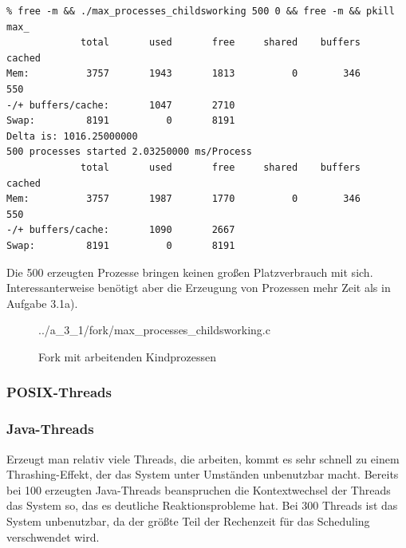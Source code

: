 \documentclass[a4paper,
12pt,
BCOR12mm,
]{scrartcl}
\begin{document}
\begin{verbatim}
% free -m && ./max_processes_childsworking 500 0 && free -m && pkill max_
             total       used       free     shared    buffers     cached
Mem:          3757       1943       1813          0        346        550
-/+ buffers/cache:       1047       2710
Swap:         8191          0       8191
Delta is: 1016.25000000
500 processes started 2.03250000 ms/Process
             total       used       free     shared    buffers     cached
Mem:          3757       1987       1770          0        346        550
-/+ buffers/cache:       1090       2667
Swap:         8191          0       8191
\end{verbatim}
Die 500 erzeugten Prozesse bringen keinen großen Platzverbrauch mit sich.
Interessanterweise benötigt aber die Erzeugung von Prozessen mehr Zeit als in Aufgabe
3.1a).
\begin{figure}[h!]
	\begin{center}
		 {../a_3_1/fork/max_processes_childsworking.c}
	\end{center}
	\caption{Fork mit arbeitenden Kindprozessen}
	\label{fig:fork_childsworking_listing}
\end{figure}

\subsubsection*{POSIX-Threads}

\subsubsection*{Java-Threads}
Erzeugt man relativ viele Threads, die arbeiten, kommt es sehr schnell zu einem Thrashing-Effekt, der das System
unter Umständen unbenutzbar macht. Bereits bei 100 erzeugten Java-Threads beanspruchen die Kontextwechsel der Threads
das System so, das es deutliche Reaktionsprobleme hat. Bei 300 Threads ist das System unbenutzbar, da der größte Teil
der Rechenzeit für das Scheduling verschwendet wird.
\end{document}
